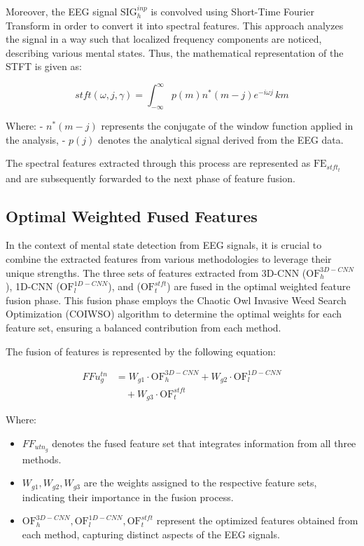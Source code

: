 \documentclass[conference]{IEEEtran}
\begin{document}
Moreover, the EEG signal \( \text{SIG}_h^{inp} \) is convolved using Short-Time Fourier Transform in order to convert it into spectral features. This approach analyzes the signal in a way such that localized frequency components are noticed, describing various mental states. Thus, the mathematical representation of the STFT is given as:



\[
\textit{stft}(\omega, j, \gamma) = \int_{-\infty}^{\infty} p(m) n^*(m - j) e^{-i\omega j} \, km       \tag{2}
\]


Where:
- \( n^*(m - j) \) represents the conjugate of the window function applied in the analysis,
- \( p(j) \) denotes the analytical signal derived from the EEG data.

The spectral features extracted through this process are represented as \( \text{FE}_{stft_t} \) and are subsequently forwarded to the next phase of feature fusion.
\subsection{Optimal Weighted Fused Features}

In the context of mental state detection from EEG signals, it is crucial to combine the extracted features from various methodologies to leverage their unique strengths. The three sets of features extracted from 3D-CNN (\( \text{OF}^{3D-CNN}_h \)), 1D-CNN (\( \text{OF}^{1D-CNN}_l \)), and (\( \text{OF}^{stft}_t \)) are fused in the optimal weighted feature fusion phase. This fusion phase employs the Chaotic Owl Invasive Weed Search Optimization (COIWSO) algorithm to determine the optimal weights for each feature set, ensuring a balanced contribution from each method.

The fusion of features is represented by the following equation:

\[
\begin{align}
FFu^{tn}_g &= W_{g1} \cdot \text{OF}^{3D-CNN}_h + W_{g2} \cdot \text{OF}^{1D-CNN}_l \\
&\quad + W_{g3} \cdot \text{OF}^{stft}_t   
\end{align}
\tag{3}
\]

Where:

\begin{itemize}
    \item \( FF_{utn_g} \) denotes the fused feature set that integrates information from all three methods.
    \item \( W_{g1}, W_{g2}, W_{g3} \) are the weights assigned to the respective feature sets, indicating their importance in the fusion process.
    \item \( \text{OF}^{3D-CNN}_h, \text{OF}^{1D-CNN}_l, \text{OF}^{stft}_t \) represent the optimized features obtained from each method, capturing distinct aspects of the EEG signals.
\end{itemize}
\end{document}
